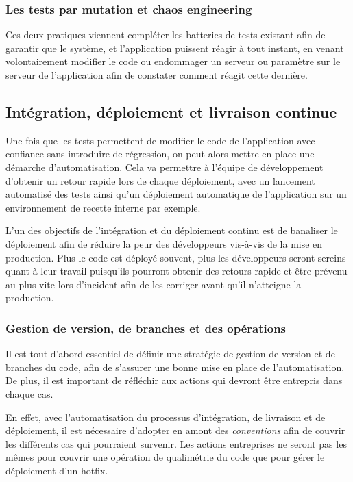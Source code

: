 \subsubsection{Les tests par mutation et chaos engineering}


Ces deux pratiques viennent compléter les batteries de tests existant afin de garantir que le système, et l'application puissent réagir à tout instant, en venant volontairement modifier le code ou endommager un serveur ou paramètre sur le serveur de l'application afin de constater comment réagit cette dernière.

\subsection{Intégration, déploiement et livraison continue}

Une fois que les tests permettent de modifier le code de l'application avec confiance sans introduire de régression, on peut alors mettre en place une démarche d'automatisation. Cela va permettre à l'équipe de développement d'obtenir un retour rapide lors de chaque déploiement, avec un lancement automatisé des tests ainsi qu'un déploiement automatique de l'application sur un environnement de recette interne par exemple.

L'un des objectifs de l'intégration et du déploiement continu est de banaliser le déploiement afin de réduire la peur des développeurs vis-à-vis de la mise en production. Plus le code est déployé souvent, plus les développeurs seront sereins quant à leur travail puisqu'ils pourront obtenir des retours rapide et être prévenu au plus vite lors d'incident afin de les corriger avant qu'il n'atteigne la production.

\subsubsection{Gestion de version, de branches et des opérations}

Il est tout d'abord essentiel de définir une stratégie de gestion de version et de branches du code, afin de s'assurer une bonne mise en place de l'automatisation. De plus, il est important de réfléchir aux actions qui devront être entrepris dans chaque cas. 

En effet, avec l'automatisation du processus d'intégration, de livraison et de déploiement, il est nécessaire d'adopter en amont des \emph{conventions} afin de couvrir les différents cas qui pourraient survenir. Les actions entreprises ne seront pas les mêmes pour couvrir une opération de qualimétrie du code que pour gérer le déploiement d'un \gls{hotfix}.

